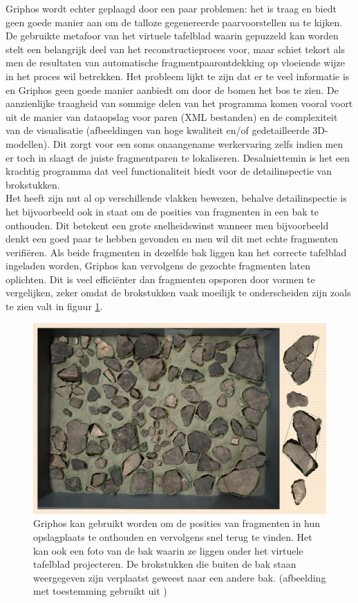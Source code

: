 Griphos wordt echter geplaagd door een paar problemen: het is traag en biedt geen goede manier aan om de talloze gegenereerde paarvoorstellen na te kijken. De gebruikte metafoor van het virtuele tafelblad waarin gepuzzeld kan worden stelt een belangrijk deel van het reconstructieproces voor, maar schiet tekort als men de resultaten van automatische fragmentpaarontdekking op vloeiende wijze in het proces wil betrekken. Het probleem lijkt te zijn dat er te veel informatie is en Griphos geen goede manier aanbiedt om door de bomen het bos te zien. De aanzienlijke traagheid van sommige delen van het programma komen vooral voort uit de manier van dataopslag voor paren (XML bestanden) en de complexiteit van de visualisatie (afbeeldingen van hoge kwaliteit en/of gedetailleerde 3D-modellen). Dit zorgt voor een soms onaangename werkervaring zelfs indien men er toch in slaagt de juiste fragmentparen te lokaliseren. Desalniettemin is het een krachtig programma dat veel functionaliteit biedt voor de detailinspectie van brokstukken.\\

Het heeft zijn nut al op verschillende vlakken bewezen, behalve detailinspectie is het bijvoorbeeld ook in staat om de posities van fragmenten in een bak te onthouden. Dit betekent een grote snelheidswinst wanneer men bijvoorbeeld denkt een goed paar te hebben gevonden en men wil dit met echte fragmenten verifi\"eren. Als beide fragmenten in dezelfde bak liggen kan het correcte tafelblad ingeladen worden, Griphos kan vervolgens de gezochte fragmenten laten oplichten. Dit is veel effici\"enter dan fragmenten opsporen door vormen te vergelijken, zeker omdat de brokstukken vaak moeilijk te onderscheiden zijn zoals te zien valt in figuur \ref{fig:griphosbak}. 

\begin{figure}[ht]
	\begin{center}
		\includegraphics[width=.8\columnwidth]{images/griphos-bak-01.png}
		\caption{Griphos kan gebruikt worden om de posities van fragmenten in hun opslagplaats te onthouden en vervolgens snel terug te vinden. Het kan ook een foto van de bak waarin ze liggen onder het virtuele tafelblad projecteren. De brokstukken die buiten de bak staan weergegeven zijn verplaatst geweest naar een andere bak. (afbeelding met toestemming gebruikt uit \cite{Brown2011})}
		\label{fig:griphosbak}
	\end{center}
\end{figure}

